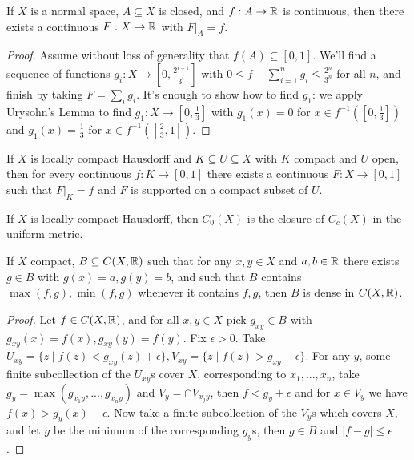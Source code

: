 \documentclass[letterpaper,11pt]{report}
\begin{document}
\begin{thm}\label{tietze} If $X$ is a normal space, $A \subseteq X$ is closed, and $f : A \rightarrow \mathbb{R}$ is continuous, then there exists a continuous $F : X \rightarrow \mathbb{R}$ with $F|_A = f$.
\end{thm}
\begin{proof} Assume without loss of generality that $f(A) \subseteq [0,1]$. We'll find a sequence of functions $g_i: X \rightarrow [0, \frac{2^{i-1}}{3^i}]$ with $0 \le f - \sum_{i=1}^n g_i \le \frac{2^n}{3^n}$ for all $n$, and finish by taking $F = \sum_i g_i$. It's enough to show how to find $g_1$: we apply Urysohn's Lemma to find $g_1 : X \rightarrow [0,\frac{1}{3}]$ with $g_1(x) = 0$ for $x \in f^{-1}([0,\frac{1}{3}])$ and $g_1(x) = \frac{1}{3}$ for $x \in f^{-1}([\frac{2}{3},1])$.
\end{proof}

\begin{cor}\label{lch-tietze} If $X$ is locally compact Hausdorff and $K \subseteq U \subseteq X$ with $K$ compact and $U$ open, then for every continuous $f : K \rightarrow [0,1]$ there exists a continuous $F : X \rightarrow [0,1]$ such that $F|_K = f$ and $F$ is supported on a compact subset of $U$.
\end{cor}

\begin{prop} If $X$ is locally compact Hausdorff, then $C_0(X)$ is the closure of $C_c(X)$ in the uniform metric.
\end{prop}

\begin{thm} If $X$ compact, $B \subseteq C(X,\mathbb{R})$ such that for any $x,y \in X$ and $a,b \in \mathbb{R}$ there exists $g \in B$ with $g(x) = a, g(y) = b$, and such that $B$ contains $\max(f,g), \min(f,g)$ whenever it contains $f,g$, then $B$ is dense in $C(X,\mathbb{R})$.
\end{thm}
\begin{proof} Let $f \in C(X,\mathbb{R})$, and for all $x,y \in X$ pick $g_{xy} \in B$ with $g_{xy}(x) = f(x), g_{xy}(y) = f(y)$. Fix $\epsilon > 0$. Take $U_{xy} = \{z \mid f(z) < g_{xy}(z) + \epsilon\}, V_{xy} = \{z \mid f(z) > g_{xy} - \epsilon\}$. For any $y$, some finite subcollection of the $U_{xy}$s cover $X$, corresponding to $x_1, ..., x_n$, take $g_y = \max(g_{x_1y}, ..., g_{x_ny})$ and $V_y = \cap V_{x_jy}$, then $f < g_y + \epsilon$ and for $x \in V_y$ we have $f(x) > g_y(x) - \epsilon$. Now take a finite subcollection of the $V_y$s which covers $X$, and let $g$ be the minimum of the corresponding $g_y$s, then $g \in B$ and $|f-g| \le \epsilon$.
\end{proof}
\end{document}
